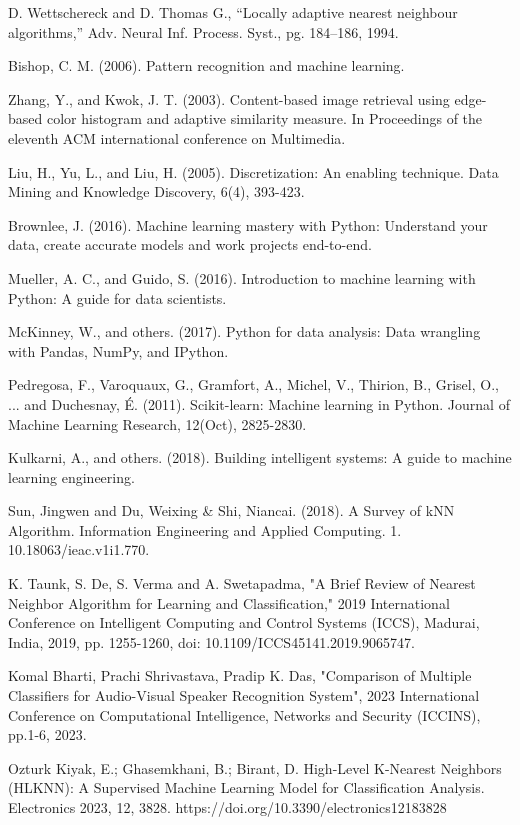 \documentclass[conference]{IEEEtran}
\begin{document}
\begin{thebibliography}{1}
D. Wettschereck and D. Thomas G., “Locally adaptive nearest neighbour algorithms,” Adv. Neural Inf. Process. Syst., pg. 184–186, 1994.


Bishop, C. M. (2006). Pattern recognition and machine learning.

Zhang, Y., and Kwok, J. T. (2003). Content-based image retrieval using edge-based color histogram and adaptive similarity measure. In Proceedings of the eleventh ACM international conference on Multimedia.

Liu, H., Yu, L., and Liu, H. (2005). Discretization: An enabling technique. Data Mining and Knowledge Discovery, 6(4), 393-423.

Brownlee, J. (2016). Machine learning mastery with Python: Understand your data, create accurate models and work projects end-to-end.

Mueller, A. C., and Guido, S. (2016). Introduction to machine learning with Python: A guide for data scientists.

McKinney, W., and others. (2017). Python for data analysis: Data wrangling with Pandas, NumPy, and IPython.

Pedregosa, F., Varoquaux, G., Gramfort, A., Michel, V., Thirion, B., Grisel, O., ... and Duchesnay, É. (2011). Scikit-learn: Machine learning in Python. Journal of Machine Learning Research, 12(Oct), 2825-2830.

Kulkarni, A., and others. (2018). Building intelligent systems: A guide to machine learning engineering.

Sun, Jingwen and Du, Weixing \& Shi, Niancai. (2018). A Survey of kNN Algorithm. Information Engineering and Applied Computing. 1. 10.18063/ieac.v1i1.770. 

K. Taunk, S. De, S. Verma and A. Swetapadma, "A Brief Review of Nearest Neighbor Algorithm for Learning and Classification," 2019 International Conference on Intelligent Computing and Control Systems (ICCS), Madurai, India, 2019, pp. 1255-1260, doi: 10.1109/ICCS45141.2019.9065747.

Komal Bharti, Prachi Shrivastava, Pradip K. Das, "Comparison of Multiple Classifiers for Audio-Visual Speaker Recognition System", 2023 International Conference on Computational Intelligence, Networks and Security (ICCINS), pp.1-6, 2023.

Ozturk Kiyak, E.; Ghasemkhani, B.; Birant, D. High-Level K-Nearest Neighbors (HLKNN): A Supervised Machine Learning Model for Classification Analysis. Electronics 2023, 12, 3828. https://doi.org/10.3390/electronics12183828


\end{thebibliography}
\end{document}
